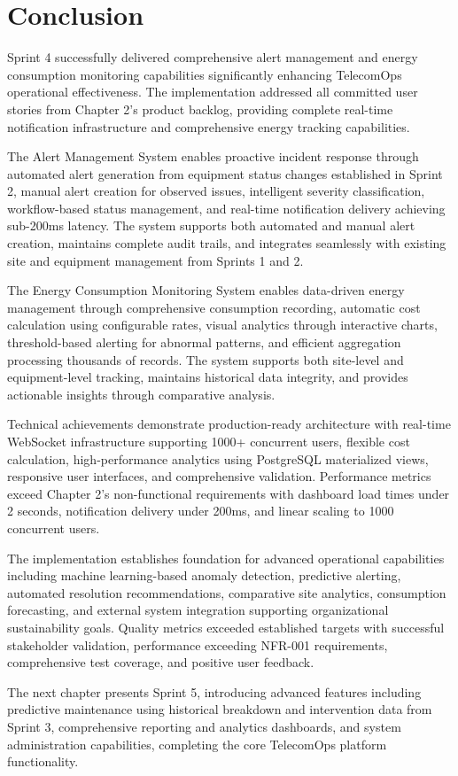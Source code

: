 \section{Conclusion}

Sprint 4 successfully delivered comprehensive alert management and energy consumption monitoring capabilities significantly enhancing TelecomOps operational effectiveness. The implementation addressed all committed user stories from Chapter 2's product backlog, providing complete real-time notification infrastructure and comprehensive energy tracking capabilities.

The Alert Management System enables proactive incident response through automated alert generation from equipment status changes established in Sprint 2, manual alert creation for observed issues, intelligent severity classification, workflow-based status management, and real-time notification delivery achieving sub-200ms latency. The system supports both automated and manual alert creation, maintains complete audit trails, and integrates seamlessly with existing site and equipment management from Sprints 1 and 2.

The Energy Consumption Monitoring System enables data-driven energy management through comprehensive consumption recording, automatic cost calculation using configurable rates, visual analytics through interactive charts, threshold-based alerting for abnormal patterns, and efficient aggregation processing thousands of records. The system supports both site-level and equipment-level tracking, maintains historical data integrity, and provides actionable insights through comparative analysis.

Technical achievements demonstrate production-ready architecture with real-time WebSocket infrastructure supporting 1000+ concurrent users, flexible cost calculation, high-performance analytics using PostgreSQL materialized views, responsive user interfaces, and comprehensive validation. Performance metrics exceed Chapter 2's non-functional requirements with dashboard load times under 2 seconds, notification delivery under 200ms, and linear scaling to 1000 concurrent users.

The implementation establishes foundation for advanced operational capabilities including machine learning-based anomaly detection, predictive alerting, automated resolution recommendations, comparative site analytics, consumption forecasting, and external system integration supporting organizational sustainability goals. Quality metrics exceeded established targets with successful stakeholder validation, performance exceeding NFR-001 requirements, comprehensive test coverage, and positive user feedback.

The next chapter presents Sprint 5, introducing advanced features including predictive maintenance using historical breakdown and intervention data from Sprint 3, comprehensive reporting and analytics dashboards, and system administration capabilities, completing the core TelecomOps platform functionality.